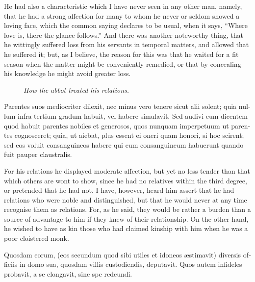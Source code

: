\documentclass{book}
\newcommand{\blockhead}[4][]{
\begin{figure}
\centering
\vspace{#4}
\parbox{2.75cm}{\begin{center}\footnotesize \color{BrickRed} \emph{#2}\\ #1 \end{center}}
\end{figure}
}
\begin{document}
\begin{paracol}{2}
\switchcolumn

He had also a characteristic which I have never seen in any other man, namely, that he had a strong affection for many to whom he never or seldom showed a loving face, which the common saying declares to be usual, when it says, ``Where love is, there the glance follows.'' And there was another noteworthy thing, that he wittingly suffered loss from his servants in temporal matters, and allowed that he suffered it; but, as I believe, the reason for this was that he waited for a fit season when the matter might be conveniently remedied, or that by concealing his knowledge he might avoid greater loss.

\switchcolumn*

\begin{otherlanguage}{latin}
\blockhead{How the abbot treated his relations.}{3}{-0.55cm}
Parentes suos mediocriter dilexit, nec minus vero tenere sicut alii solent; quia nullum infra tertium gradum habuit, vel habere simulavit. Sed audivi eum dicentem quod habuit parentes nobiles et generosos, quos nunquam imperpetuum ut parentes cognosceret; quia, ut aiebat, plus essent ei oneri quam honori, si hoc scirent; sed eos voluit consanguineos habere qui eum consanguineum habuerunt quando fuit pauper claustralis.

\end{otherlanguage}

\switchcolumn

For his relations he displayed moderate affection, but yet no less tender than that which others are wont to show, since he had no relatives within the third degree, or pretended that he had not. I have, however, heard him assert that he had relations who were noble and distinguished, but that he would never at any time recognise them as relations. For, as he said, they would be rather a burden than a source of advantage to him if they knew of their relationship. On the other hand, he wished to have as kin those who had claimed kinship with him when he was a poor cloistered monk.

\switchcolumn*

\begin{otherlanguage}{latin}
Quosdam eorum, (eos secundum quod sibi utiles et idoneos \ae{}stimavit) diversis officiis in domo sua, quosdam villis custodiendis, deputavit. Quos autem infideles probavit, a se elongavit, sine spe redeundi.
\end{otherlanguage}

\switchcolumn


\end{paracol}
\end{document}
